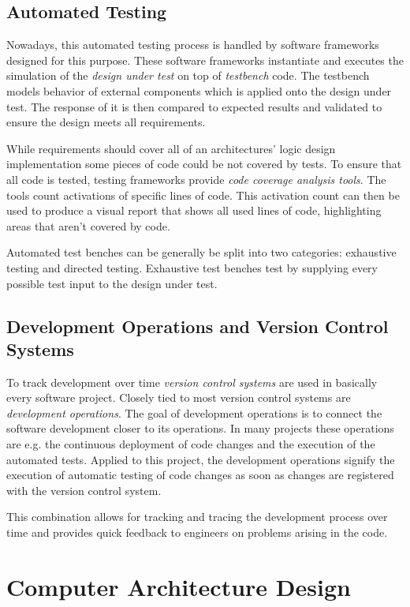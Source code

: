 \subsection{Automated Testing}
Nowadays, this automated testing process is handled by software frameworks designed for this purpose. These software frameworks instantiate and executes the simulation of the \textit{design under test} on top of \textit{testbench} code. The testbench models behavior of external components which is applied onto the design under test. The response of it is then compared to expected results and validated to ensure the design meets all requirements.

While requirements should cover all of an architectures' logic design implementation some pieces of code could be not covered by tests. To ensure that all code is tested, testing frameworks provide \textit{code coverage analysis tools}. The tools count activations of specific lines of code. This activation count can then be used to produce a visual report that shows all used lines of code, highlighting areas that aren't covered by code.

Automated test benches can be generally be split into two categories: exhaustive testing and directed testing. Exhaustive test benches test by supplying every possible test input to the design under test. 

\cite{verilogtestbenches} \cite{exhaustivetesting} \cite{directedtesting}


\subsection{Development Operations and Version Control Systems}
To track development over time \textit{version control systems} are used in basically every software project. Closely tied to most version control systems are \textit{development operations}. The goal of development operations is to connect the software development closer to its operations. In many projects these operations are e.g. the continuous deployment of code changes and the execution of the automated tests. Applied to this project, the development operations signify the execution of automatic testing of code changes as soon as changes are registered with the version control system. 

This combination allows for tracking and tracing the development process over time and provides quick feedback to engineers on problems arising in the code.

\section{Computer Architecture Design}
